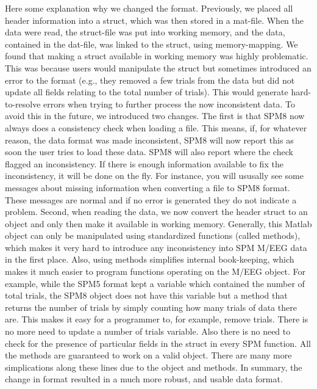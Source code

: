 Here some explanation why we changed the format. Previously, we placed
all header information into a struct, which was then stored in a
mat-file. When the data were read, the struct-file was put into
working memory, and the data, contained in the dat-file, was linked to 
the struct, using memory-mapping. We found that making a struct
available in working memory was highly problematic. This was because
users would manipulate the 
struct but sometimes introduced an error to the format (e.g., they
removed a few 
trials from the data but did not update all fields relating to the
total number of trials). This would generate hard-to-resolve errors
when trying to further process the now inconsistent data. To avoid
this in the future, we introduced two changes. The first is that
SPM8 now 
always does a consistency check when loading a file. This means, if,
for whatever reason, the data format was made inconsistent, SPM8 will
now report this as soon the user tries to load these data. SPM8 will
also report where the check flagged an inconsistency. If there is enough
information available to fix the inconsistency, it will be done on the fly.
For instance, you will ususally see some messages about missing information when
converting a file to SPM8 format. These messages are normal and if no 
error is generated they do not indicate a problem. Second,
when reading the data, we now convert the header struct to an object
and only then make it available in working memory. Generally, this
Matlab object can only be manipulated using standardized functions
(called methods), which makes it very hard to introduce any
inconsistency into SPM M/EEG data in the first place. Also, using
methods simplifies internal book-keeping, which makes it much easier
to program functions operating on the M/EEG object. For example, while
the SPM5 format kept a variable which contained the number of total
trials, the SPM8 object does not have this variable but a method that
returns the number of trials by simply counting how many trials of
data there are. This makes it easy for a programmer to, for example,
remove trials. There is no more need to update a number of trials
variable. Also there is no need to check for the presence of particular fields
in the struct in every SPM function. All the methods are guaranteed to work on
a valid object. There are many more simplications along these lines due to
the object and methods. In summary, the change in format resulted in a
much more robust, and usable data format.

